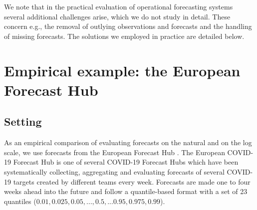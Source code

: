 \documentclass[10pt,letterpaper]{article}
\begin{document}
We note that in the practical evaluation of operational forecasting systems  several additional challenges arise, which we do not study in detail. These concern e.g., the removal of outlying observations and forecasts and the handling of missing forecasts. The solutions we employed in practice are detailed below.

\section*{Empirical example: the European Forecast Hub}
\label{sec:HUB}

\subsection*{Setting}
\label{sec:HUB-setting}

As an empirical comparison of evaluating forecasts on the natural and on the log scale, we use forecasts from the European Forecast Hub \cite{europeancovid-19forecasthubEuropeanCovid19Forecast2021, sherrattPredictivePerformanceMultimodel2022}. 
The European COVID-19 Forecast Hub is one of several COVID-19 Forecast Hubs \cite{cramerEvaluationIndividualEnsemble2021, bracherShorttermForecastingCOVID192021} which have been systematically collecting, aggregating and evaluating forecasts of several COVID-19 targets created by different teams every week. Forecasts are made one to four weeks ahead into the future and follow a quantile-based format with a set of 23 quantiles ($0.01, 0.025, 0.05, ..., 0.5, ... 0.95, 0.975, 0.99$). 
\end{document}
